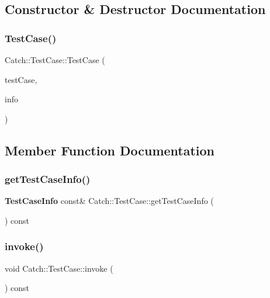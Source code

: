 \subsection{Constructor \& Destructor Documentation}
\mbox{\label{class_catch_1_1_test_case_aae5709fc1cb68e19ab0ac27e1ffd6a76}} 
\subsubsection{TestCase()}
{\footnotesize\ttfamily Catch\+::\+Test\+Case\+::\+Test\+Case (\begin{DoxyParamCaption}\item[{\textbf{ I\+Test\+Invoker} $\ast$}]{test\+Case,  }\item[{\textbf{ Test\+Case\+Info} \&\&}]{info }\end{DoxyParamCaption})}



\subsection{Member Function Documentation}
\mbox{\label{class_catch_1_1_test_case_a1ea0d79f49156cebea076fe1ba50d2b6}} 
\subsubsection{getTestCaseInfo()}
{\footnotesize\ttfamily \textbf{ Test\+Case\+Info} const\& Catch\+::\+Test\+Case\+::get\+Test\+Case\+Info (\begin{DoxyParamCaption}{ }\end{DoxyParamCaption}) const}

\mbox{\label{class_catch_1_1_test_case_a26f346c8446dded0562fe3818ae71651}} 
\subsubsection{invoke()}
{\footnotesize\ttfamily void Catch\+::\+Test\+Case\+::invoke (\begin{DoxyParamCaption}{ }\end{DoxyParamCaption}) const}

\mbox{\label{class_catch_1_1_test_case_a030e4b9282e9b32e08c8bd5e5cd6fa98}} 
